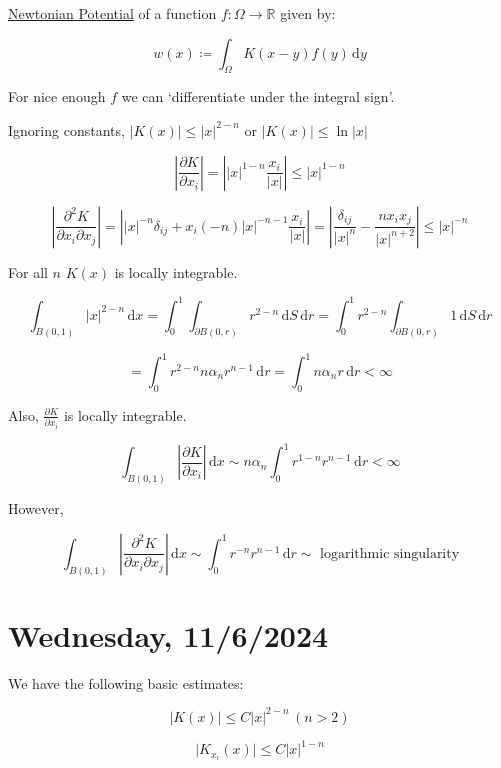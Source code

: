 \documentclass{article}
\theoremstyle{definition}
\begin{document}
\underline{Newtonian Potential} of a function \(f: \Omega \to \mathbb{R}\) given by:

\[
    w(x) \coloneqq \int_{\Omega} K(x-y) f(y) \,\mathrm{d}y 
\]

For nice enough \(f\) we can `differentiate under the integral sign'.

Ignoring constants, \(\vert K(x) \vert \leq \vert x \vert ^{2-n}\) or \(\vert K(x) \vert \leq \ln \vert x \vert \) 

\[
    \left\vert \frac{\partial K}{\partial x_i}  \right\vert = \left\vert \vert x \vert ^{1-n} \frac{x_i}{\vert x \vert } \right\vert \leq \vert x \vert ^{1-n}
\]

\[
    \left\vert \frac{\partial ^2 K}{\partial x_i \partial x_j} \right\vert = \left\vert \vert x \vert ^{-n}\delta_{ij} + x_i(-n) \vert x \vert ^{-n-1} \frac{x_i}{\vert x \vert } \right\vert = \left\vert \frac{\delta_{ij}}{\vert x \vert ^ n} - \frac{n x_i x_j}{\vert x \vert ^{n+2}} \right\vert \leq \vert x \vert ^{-n}
\]

For all \(n\) \(K(x)\) is locally integrable.

\[
    \int_{B(0,1)} \vert x \vert^{2-n}\, \mathrm{d}x = \int_{0}^{1} \int_{\partial B(0,r)} r^{2-n} \,\mathrm{d}S  \,\mathrm{d}r = \int_{0}^{1} r^{2-n} \int_{\partial B(0,r)} 1 \,\mathrm{d}S  \,\mathrm{d}r 
\]

\[
    = \int_{0}^{1} r^{2-n} n \alpha_n r^{n-1}  \,\mathrm{d}r = \int_{0}^{1} n \alpha_n r \,\mathrm{d}r < \infty
\]

Also, \(\frac{\partial K}{\partial x_i} \) is locally integrable.

\[
    \int_{B(0,1)} \left\vert \frac{\partial K}{\partial x_i}  \right\vert \,\mathrm{d}x \sim n \alpha_n \int_{0}^{1} r^{1-n} r^{n-1} \,\mathrm{d}r < \infty 
\]

However,

\[
    \int_{B(0,1)} \left\vert \frac{\partial ^2 K}{\partial x_i \partial x_j} \right\vert  \,\mathrm{d}x \sim \int_{0}^{1} r^{-n} r^{n-1} \,\mathrm{d}r \sim \text{ logarithmic singularity} 
\]

\section*{Wednesday, 11/6/2024}

We have the following basic estimates:

\[
    \vert K(x) \vert \leq C \vert x \vert ^{2-n} \, (n > 2)
\]

\[
    \vert K_{x_i}(x) \vert \leq C \vert x \vert ^{1-n}
\]
\end{document}
